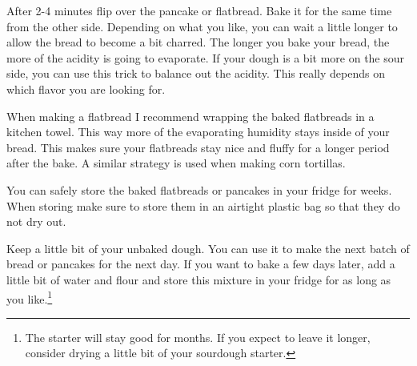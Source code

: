 After 2-4 minutes flip over the pancake or flatbread. Bake it for the same
time from the other side. Depending on what you like, you can wait a little
longer to allow the bread to become a bit charred. The longer you
bake your bread, the more of the acidity is going to evaporate. If your
dough is a bit more on the sour side, you can use this trick to balance
out the acidity. This really depends on which flavor you are looking for.

When making a flatbread I recommend wrapping the baked flatbreads
in a kitchen towel. This way more of the evaporating humidity
stays inside of your bread. This makes sure your flatbreads stay
nice and fluffy for a longer period after the bake. A similar strategy is
used when making corn tortillas.

You can safely store the baked flatbreads or pancakes in your fridge
for weeks. When storing make sure to store them in an airtight plastic bag so that
they do not dry out.

Keep a little bit of your unbaked dough. You can use it to make the next
batch of bread or pancakes for the next day. If you want to bake a few days later, add
a little bit of water and flour and store this mixture in your fridge
for as long as you like.\footnote{The starter will stay good for months. If you expect to
leave it longer, consider drying a little bit of your sourdough starter.}

